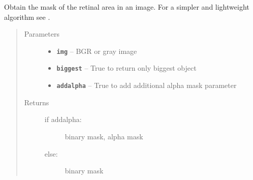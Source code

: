 \documentclass[letterpaper,10pt,english]{sphinxmanual}
\begin{document}

\begin{fulllineitems}
\label{RRtoolbox.tools:RRtoolbox.tools.segmentation.retinal_mask}
Obtain the mask of the retinal area in an image.
For a simpler and lightweight algorithm see {\hyperref[RRtoolbox.tools:RRtoolbox.tools.segmentation.retinal_mask_watershed]{\emph{}}}.
\begin{quote}\begin{description}
\item[{Parameters}] \leavevmode\begin{itemize}
\item {} 
\textbf{\texttt{img}} -- BGR or gray image

\item {} 
\textbf{\texttt{biggest}} -- True to return only biggest object

\item {} 
\textbf{\texttt{addalpha}} -- True to add additional alpha mask parameter

\end{itemize}

\item[{Returns}] \leavevmode
\begin{description}
\item[{if addalpha:}] \leavevmode
binary mask, alpha mask

\item[{else:}] \leavevmode
binary mask

\end{description}


\end{description}\end{quote}

\end{fulllineitems}

\end{document}
